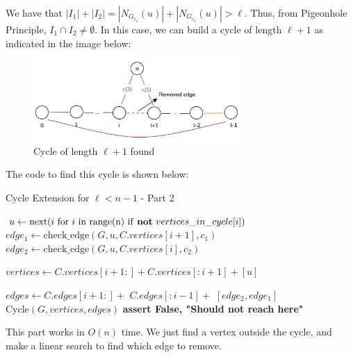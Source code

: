 We have that $|I_1| + |I_2| = |N_{G_{c_1}}(u)| + |N_{G_{c_2}}(u)| > \ell$. Thus, 
from Pigeonhole Principle, $I_1 \cap I_2 \neq \emptyset$. In this case, we can build a cycle of length $\ell + 1$
as indicated in the image below:

\begin{figure}[H]
    \centering
    \includegraphics[width=0.7\textwidth]{figuras/cycle_cycle_extension.png}
    \caption{Cycle of length \( \ell + 1 \) found}
    \label{fig:cycle_cycle_extension}
\end{figure}

The code to find this cycle is shown below:

\begin{algorithm}[H]
    \caption{Cycle Extension for \( \ell < n - 1 \) - Part 2}
    \begin{algorithmic}
            \State $u \gets \text{next}(i \text{ for } i \text{ in range(n) if \textbf{not} } vertices\_in\_cycle[i])$
                \State $edge_1 \gets \text{check\_edge}(G, u, C.vertices[i + 1], c_1)$
                \State $edge_2 \gets \text{check\_edge}(G, u, C.vertices[i], c_2)$
                
                    \State $vertices \gets C.vertices[i + 1:] + C.vertices[:i + 1] + [u]$

                    \State $edges \gets C.edges[i + 1:] +$
                    \State \hspace{3.4em} $C.edges[:i - 1] +$
                    \State \hspace{3.4em} $[edge_2, edge_1]$
                    \State \Return $\text{Cycle}(G, vertices, edges)$
                \EndIf
            \EndFor
            \State \textbf{assert False, "Should not reach here"}
        \EndFunction
    \end{algorithmic}
\end{algorithm}

This part works in $O(n)$ time. We just find a vertex outside the cycle,
and make a linear search to find which edge to remove.

